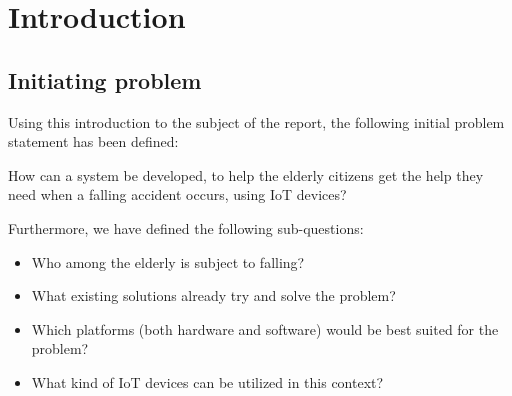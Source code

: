 \chapter*{Introduction}


\section*{Initiating problem}
Using this introduction to the subject of the report, the following initial problem statement has been defined:

\begin{center}
    How can a system be developed, to help the elderly citizens get the help they need when a falling accident occurs, using IoT devices?
\end{center}

Furthermore, we have defined the following sub-questions:
\begin{itemize}
\item Who among the elderly is subject to falling?
\item What existing solutions already try and solve the problem?
\item Which platforms (both hardware and software) would be best suited for the problem?
\item What kind of IoT devices can be utilized in this context?
\end{itemize}